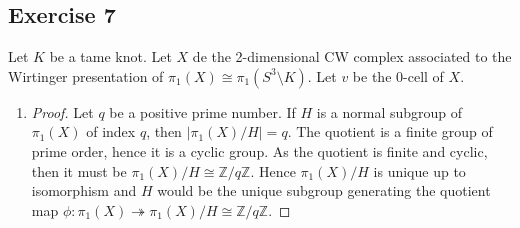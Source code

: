 \documentclass[11pt,a4paper]{article}
\newcommand{\Z}{\mathbb Z}
\begin{document}
\subsection*{Exercise 7}
Let $ K $ be a tame knot. Let $X$ de the 2-dimensional CW complex associated to the Wirtinger presentation of $\pi_1(X) \cong \pi_1(S^3 \setminus K)$. Let $v$ be the $0$-cell of $X$.
\begin{enumerate}[label=\alph*)]
  \item \begin{proof}
    Let $ q $ be a positive prime number. If $ H $ is a normal subgroup of $ \pi_1(X) $ of index $ q $, then $ |\pi_1(X)/H| = q $. The quotient is a finite group of prime order, hence it is a cyclic group. As the quotient is finite and cyclic, then it must be $ \pi_1(X)/H \cong \Z / q\Z $. Hence $\pi_1(X)/H$ is unique up to isomorphism and $ H $ would be the unique subgroup generating the quotient map $ \phi \colon \pi_1(X) \twoheadrightarrow \pi_1(X) / H \cong \Z / q\Z $.


\end{proof}
\end{enumerate}
\end{document}

